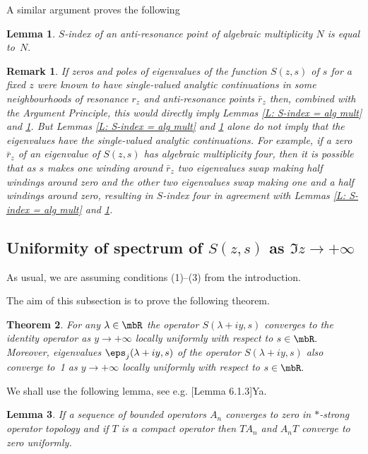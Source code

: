 \documentclass[11pt]{amsart}
\newtheorem{thm}{Theorem}                     [section]
\newtheorem{lemma}[thm]{Lemma}
\newtheorem{rems*}{Remark}
\numberwithin{equation}{section}
\begin{document}
A similar argument proves the following
\begin{lemma} \label{L: S-index = alg mult (2)} $S$-index of an anti-resonance point of algebraic multiplicity $N$ is equal to~$N.$
\end{lemma}

\begin{rems*} \rm If zeros and poles of eigenvalues of the function $S(z,s)$ of $s$ for a fixed $z$ were known to have single-valued analytic continuations
in some neighbourhoods of resonance $r_z$ and anti-resonance points $\bar r_z$ then,
combined with the Argument Principle, this would directly imply Lemmas \ref{L: S-index = alg mult} and \ref{L: S-index = alg mult (2)}.
But Lemmas \ref{L: S-index = alg mult} and \ref{L: S-index = alg mult (2)} alone do not imply that
the eigenvalues have the single-valued analytic continuations. For example, if a zero $\bar r_z$ of an eigenvalue of $S(z,s)$ has algebraic multiplicity four,
then it is possible that as $s$ makes one winding around $\bar r_z$ two eigenvalues swap making half windings around zero and the other two eigenvalues swap making one and a half windings around zero,
resulting in $S$-index four in agreement with Lemmas \ref{L: S-index = alg mult} and \ref{L: S-index = alg mult (2)}.
\end{rems*}

\subsection{Uniformity of spectrum of $S(z,s)$ as $\Im z \to +\infty$}
\label{SS: uniformity}
As usual, we are assuming conditions (1)--(3) from the introduction.

The aim of this subsection is to prove the following theorem.
\begin{thm} \label{T: eigenvalues of S(z,s) converge uniformly}
For any $\lambda \in \mbR$ the operator $S(\lambda+iy,s)$
converges to the identity operator as $y \to +\infty$ locally uniformly with respect to $s \in \mbR.$
Moreover, eigenvalues $\eps_j(\lambda+iy,s)$ of the operator $S(\lambda+iy,s)$
also converge to~1 as $y \to +\infty$ locally uniformly with respect to $s \in \mbR.$
\end{thm}

We shall use the following lemma, see e.g. {\futurelet\NChar\CleverCite}[Lemma 6.1.3]{Ya}.
\begin{lemma} \label{L: Ya L 6.1.3} If a sequence of bounded operators $A_n$ converges to zero in $*$-strong operator topology
and if $T$ is a compact operator then $TA_n$ and $A_nT$ converge to zero uniformly.
\end{lemma}
\end{document}
